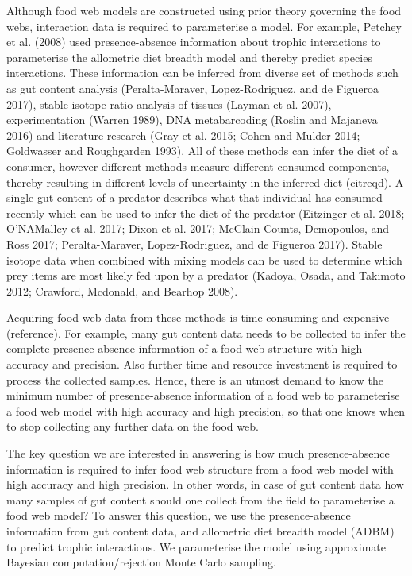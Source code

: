 \documentclass{article}
\begin{document}
Although food web models are constructed using prior theory governing
the food webs, interaction data is required to parameterise a model. For
example, Petchey et al. (2008) used presence-absence information about
trophic interactions to parameterise the allometric diet breadth model
and thereby predict species interactions. These information can be
inferred from diverse set of methods such as gut content analysis
(Peralta-Maraver, Lopez-Rodriguez, and de Figueroa 2017), stable isotope
ratio analysis of tissues (Layman et al. 2007), experimentation (Warren
1989), DNA metabarcoding (Roslin and Majaneva 2016) and literature
research (Gray et al. 2015; Cohen and Mulder 2014; Goldwasser and
Roughgarden 1993). All of these methods can infer the diet of a
consumer, however different methods measure different consumed
components, thereby resulting in different levels of uncertainty in the
inferred diet (citreqd). A single gut content of a predator describes
what that individual has consumed recently which can be used to infer
the diet of the predator (Eitzinger et al. 2018; O'NAMalley et al. 2017;
Dixon et al. 2017; McClain-Counts, Demopoulos, and Ross 2017;
Peralta-Maraver, Lopez-Rodriguez, and de Figueroa 2017). Stable isotope
data when combined with mixing models can be used to determine which
prey items are most likely fed upon by a predator (Kadoya, Osada, and
Takimoto 2012; Crawford, Mcdonald, and Bearhop 2008).

Acquiring food web data from these methods is time consuming and
expensive (reference). For example, many gut content data needs to be
collected to infer the complete presence-absence information of a food
web structure with high accuracy and precision. Also further time and
resource investment is required to process the collected samples. Hence,
there is an utmost demand to know the minimum number of presence-absence
information of a food web to parameterise a food web model with high
accuracy and high precision, so that one knows when to stop collecting
any further data on the food web.

The key question we are interested in answering is how much
presence-absence information is required to infer food web structure
from a food web model with high accuracy and high precision. In other
words, in case of gut content data how many samples of gut content
should one collect from the field to parameterise a food web model? To
answer this question, we use the presence-absence information from gut
content data, and allometric diet breadth model (ADBM) to predict
trophic interactions. We parameterise the model using approximate
Bayesian computation/rejection Monte Carlo sampling.
\end{document}
